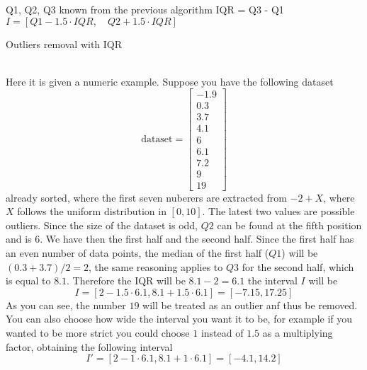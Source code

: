 \documentclass[12pt,twoside]{report}
\begin{document}
\begin{algorithm}[H]
\SetAlgoLined
{}
Q1, Q2, Q3 known from the previous algorithm\;
IQR = Q3 - Q1\;
$I=[Q1-1.5\cdot IQR,\quad Q2 + 1.5\cdot IQR]$\;
 \caption{Outliers removal with IQR}
\end{algorithm}
\noindent \\Here it is given a numeric example. Suppose you have the following dataset 
$$
\text{dataset}=\begin{bmatrix}
-1.9\\ 
0.3\\ 
3.7\\
4.1\\
6\\
6.1\\
7.2\\
9\\
19
\end{bmatrix}
$$
already sorted, where the first seven nuberers are extracted from $-2+X$, where $X$ follows the uniform distribution in $[0,10]$. The latest two values are possible outliers. Since the size of the dataset is odd, $Q2$ can be found at the fifth position and is $6$. We have then the first half and the second half. Since the first half has an even number of data points, the median of the first half ($Q1$) will be $(0.3+3.7)/2=2$, the same reasoning applies to $Q3$ for the second half, which is equal to $8.1$. Therefore the IQR will be $8.1-2=6.1$ the interval $I$ will be
$$I=[2-1.5\cdot6.1,8.1+1.5\cdot6.1]=[-7.15,17.25]$$
As you can see, the number $19$ will be treated as an outlier anf thus be removed. You can also choose how wide the interval you want it to be, for example if you wanted to be more strict you could choose $1$ instead of $1.5$ as a multiplying factor, obtaining the following interval
$$I'=[2-1\cdot6.1,8.1+1\cdot6.1]=[-4.1,14.2]$$
\end{document}
